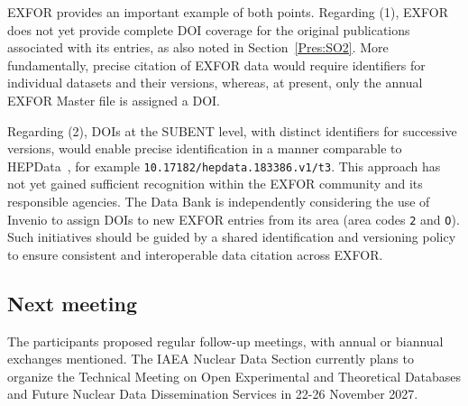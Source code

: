 EXFOR provides an important example of both points. Regarding (1), EXFOR does not yet provide complete DOI coverage for the original publications associated with its entries, as also noted in Section~\ref{Pres:SO2}. More fundamentally, precise citation of EXFOR data would require identifiers for individual datasets and their versions, whereas, at present, only the annual EXFOR Master file is assigned a DOI.

Regarding (2), DOIs at the SUBENT level, with distinct identifiers for successive versions, would enable precise identification in a manner comparable to HEPData~\cite{HEPData}, for example \texttt{10.17182/hepdata.183386.v1/t3}. This approach has not yet gained sufficient recognition within the EXFOR community and its responsible agencies. The Data Bank is independently considering the use of Invenio to assign DOIs to new EXFOR entries from its area (area codes \texttt{2} and \texttt{O}). Such initiatives should be guided by a shared identification and versioning policy to ensure consistent and interoperable data citation across EXFOR.

\subsection{Next meeting}
The participants proposed regular follow-up meetings, with annual or biannual exchanges mentioned. The IAEA Nuclear Data Section currently plans to organize the Technical Meeting on Open Experimental and Theoretical Databases and Future Nuclear Data Dissemination Services in 22-26 November 2027.


